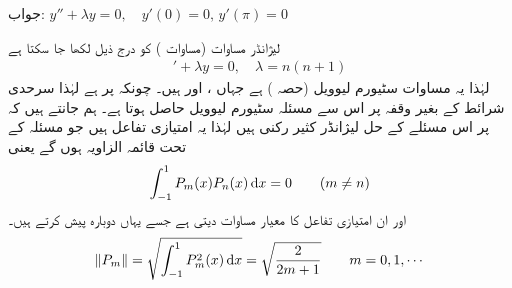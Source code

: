 جواب:
$y''+\lambda y=0, \quad y'(0)=0, \, y'(\pi)=0$

لیژانڈر  مساوات (مساوات ) کو درج ذیل لکھا جا سکتا ہے
\begin{align}
[(1-x^2)y']'+\lambda y=0,\quad \lambda=n(n+1)
\end{align}
لہٰذا یہ  مساوات سٹیورم لیوویل (حصہ ) ہے جہاں ،  اور  ہیں۔ چونکہ  پر  ہے لہٰذا  سرحدی شرائط کے بغیر وقفہ  پر اس سے مسئلہ سٹیورم لیوویل حاصل ہوتا ہے۔  ہم جانتے ہیں کہ  پر اس مسئلے کے حل لیژانڈر کثیر رکنی  ہیں لہٰذا یہ امتیازی تفاعل ہیں جو مسئلہ  کے تحت  قائمہ الزاویہ ہوں گے یعنی
\begin{align}
\int_{-1}^{1}P_m(x)P_n(x)\dif x=0\quad \quad (m \ne n)
\end{align}
اور ان امتیازی تفاعل کا معیار مساوات  دیتی ہے جسے یہاں دوبارہ پیش کرتے ہیں۔
\begin{align}
\norm{P_m}=\sqrt{\int_{-1}^{1} P_m^2(x) \dif x}=\sqrt{\frac{2}{2m+1}}\quad \quad m=0,1,\cdots
\end{align}

